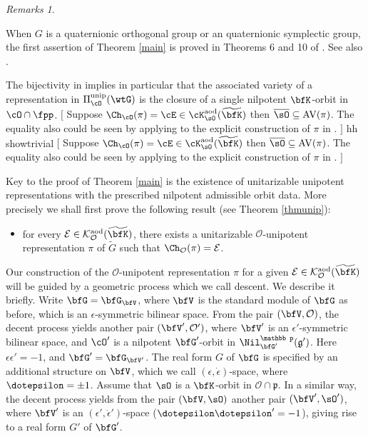 \documentclass[12pt,a4paper]{amsart}
\newcommand{\trivial}[2][]{\if\relax\detokenize{#1}\relax
  {%
      \color{orange} \vspace{0em} $[$  #2 $]$
      \color{black}
  }
  \else
\ifx#1h
\ifcsname showtrivial\endcsname
{%
    \color{orange} \vspace{0em}  $[$ #2 $]$
    \color{black}
}
\fi
\else {\red Wrong argument!} \fi
\fi
}
\newcommand{\AV}{\mathrm{AV}}
\newcommand{\CE}{{\mathcal {E}}}
\newcommand{\CK}{{\mathcal {K}}}
\newcommand{\CO}{{\mathcal {O}}}
\newcommand{\wt}{\widetilde}
\newcommand{\g}{\mathfrak g}
\newcommand{\p}{\mathfrak p}
\numberwithin{equation}{section}
\theoremstyle{remark}
\newtheorem*{remarks}{Remarks}
\def\wtbfK{\widetilde{\bfK}}
\def\bsO{\overline{\sO}}
\def\aod{\mathrm{aod}}
\def\unip{\mathrm{unip}}
\begin{document}
\begin{remarks}
\begin{enumR}
\item  When $G$ is a quaternionic orthogonal group or an quaternionic symplectic group,
  the first assertion of Theorem \ref{main} is proved in Theorems 6 and 10
  of \cite{Mc}. See also \cite[Theorem 3.1]{Tr}.
\item The bijectivity in  implies in particular that the associated variety of a representation in
  $\Pi^\unip_{\cO}(\wtG)$ is the closure of a single nilpotent $\bfK$-orbit in
  $\cO\cap \fpp$. \trivial[h]{Suppose $\Ch_{\cO}(\pi) = \cE \in \cK_{\sO}^\aod(\wtbfK)$
    then $\bsO\subseteq \AV(\pi)$. The equality also could be seen by applying
    \Cref{cor:Cbound} to the explicit
    construction of $\pi$ in \Cref{sec:cons}.}
\end{enumR}
\end{remarks}


Key to the proof of Theorem \ref{main} is the existence of unitarizable
unipotent representations with the prescribed nilpotent admissible orbit
data. More precisely we shall first prove the following result (see Theorem
\ref{thmunip}):

\begin{itemize}
\item for every $\CE\in \CK_{\CO}^\aod(\wtbfK)$, there exists a unitarizable
  $\CO$-unipotent representation $\pi$ of $\wt{G}$ such that
  $ \Ch_{\CO}( \pi)= \CE$.
\end{itemize}

Our construction of the $\CO$-unipotent representation $\pi$ for a given
$\CE\in \CK_{\CO}^\aod(\wtbfK)$ will be guided by a geometric process which we
call descent. We describe it briefly.  Write $\bfG =\bfG_{\bfV}$, where $\bfV$
is the standard module of $\bfG$ as before, which is an $\epsilon$-symmetric
bilinear space. From the pair $(\bfV, \CO)$, the decent process yields another
pair $(\bfV', \CO')$, where $\bfV'$ is an $\epsilon'$-symmetric bilinear space,
and $\cO'$ is a nilpotent $\bfG'$-orbit in $\Nil^{\mathbb p}_{\bfG'}(\g')$. Here
$\epsilon \epsilon '=-1$, and $\bfG'=\bfG_{\bfV'}$. The real form $G$ of $\bfG$
is specified by an additional structure on $\bfV$, which we call
$(\epsilon, \dot \epsilon)$-space, where $\dotepsilon =\pm 1$. Assume that
$\sO$ is a $\bfK$-orbit in $\CO\cap \p$. In a similar way, the decent process
yields from the pair $(\bfV, \sO)$ another pair $(\bfV', \sO')$, where $\bfV'$
is an $(\epsilon', \dot \epsilon')$-space ($\dotepsilon \dotepsilon' = -1$),
giving rise to a real form $G'$ of $\bfG'$.
\end{document}
